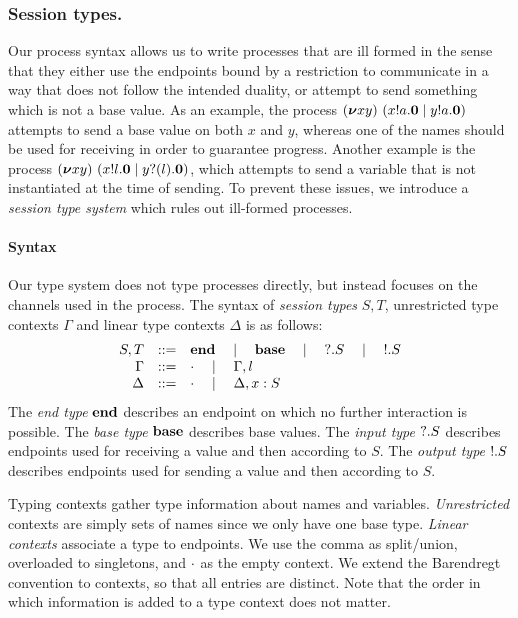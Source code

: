 \subsubsection{Session types.}
Our process syntax allows us to write processes that are ill formed in
the sense that they either use the endpoints bound by a restriction to
communicate in a way that does not follow the intended duality, or
attempt to send something which is not a base value.  As an example,
the process
\( (\bm{\nu} xy)~(x ! a . \bm{0} \mid y ! a . \bm{0}) \)
attempts to send a base value on both \( x \) and \( y\), whereas one
of the names should be used for receiving in order to guarantee
progress.  Another example is the process
\( (\bm{\nu} xy)~(x ! l . \bm{0} \mid y ? (l) . \bm{0}) \),
which attempts to send a variable that is not instantiated at the time
of sending.
%
To prevent these issues, we introduce a \emph{session type system} which
rules out ill-formed processes.

\paragraph{Syntax}
Our type system does not type processes directly, but instead focuses on the channels used in the process.
The syntax of \emph{session types} \( S, T \), unrestricted type contexts \( \Gamma \) and linear type contexts \( \Delta \) is as follows:
\[
  \begin{array}{rcl}
  S,T & ::= & \mathbf{end} \quad\mid\quad \mathbf{base} \quad\mid\quad {?}.S \quad\mid\quad {!}.S \\
    \Gamma &::= & \cdot \quad\mid\quad \Gamma, l \\
                    \Delta &::= & \cdot \quad\mid\quad \Delta, x : S
  \end{array}
\]
The \emph{end type} \( \mathbf{end} \) describes an endpoint on which no further interaction is possible.
The \emph{base type} \( \mathbf{base} \) describes base values.
The \emph{input type} \( {?}.S \) describes endpoints used for receiving a value and then according to \( S \).
The \emph{output type} \( {!}.S \) describes endpoints used for sending a value and then according to \( S \).

Typing contexts gather type information about names and variables.
\emph{Unrestricted} contexts are simply sets of names since we only have one
base type. \emph{Linear contexts} associate a type to endpoints. We use
the comma as split/union, overloaded to singletons, and \( \cdot \) as the
empty context. We extend the Barendregt convention to contexts, so that all
entries are distinct.  Note that the order in which information is added to a
type context does not matter.

